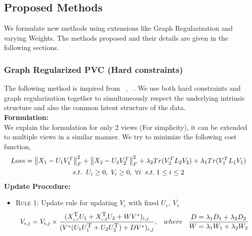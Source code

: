 \documentclass[a4paper]{article}
\begin{document}
	\subsection{Proposed Methods}
	
	We formulate new methods using extensions like Graph Regularization and varying Weights. The methods proposed and their details are given in the following sections.	
	
	\subsubsection{Graph Regularized PVC (Hard constraints)}
	
	The following method is inspired from ~\cite{pvc15}, ~\cite{Greg}. We use both hard constraints and graph regularization together to simultaneously respect the underlying intrinsic structure and also the common latent structure of the data.\\	
	
	\noindent
	\textbf{Formulation:}\\
	We explain the formulation for only 2 views (For simplicity), it can be extended to multiple views in a similar manner. We try to minimize the following cost function,
	\begin{multline}
	Loss = \begin{Vmatrix} X_{1}-U_{1}V^{T}_{1} \end{Vmatrix}^{2}_{F}	
		+ \begin{Vmatrix} X_{2}-U_{2}V^{T}_{2} \end{Vmatrix}^{2}_{F}
		+ \lambda_{2}Tr(V^{T}_{2}L_{2}V_{2}) + \lambda_{1}Tr(V^{T}_{1}L_{1}V_{1}) \\	
		s.t. \hspace{2mm}  U_{i}\geq0,\;V_{i}\geq0,\;\forall i \;\;s.t.\; 1 \leq i \leq 2
	\end{multline}
	\noindent
	\textbf{Update Procedure:}
	\begin{itemize}
		\item \textsc{Rule 1:}	Update rule for updating $V_{c}$ with fixed $U_{v}$, $\overline{V_{v}}$
			\begin{multline}
			V_{i,j} = V_{i,j} \times \frac{(X_{\text{\tiny{c,1}}}^{\text{\small{T}}}U_{1}+X_{\text{\tiny{c,2}}}^{\text{\small{T}}}U_{2}+WV^{*})_{i,j}}{(V^{*}(U_{1}U_{1}^{\text{\small{T}}}+U_{2}U_{2}^{\text{\small{T}}})+DV^{*})_{i,j}}, \;\;\; where	\;\;\;
			\frac{D=\lambda_{1}D_{1}+\lambda_{2}D_{2}}{W=\lambda_{1}W_{1}+\lambda_{2}W_{2}}\\		
			\end{multline}
	\end{itemize}		
	
\end{document}
